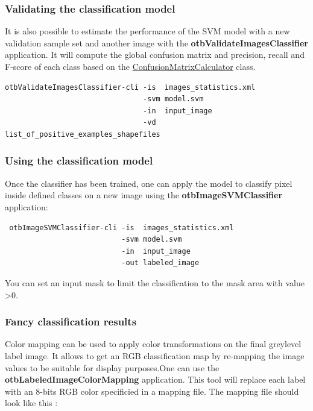 \subsubsection{Validating the classification model}
It is also possible to estimate the performance of the SVM model with a new validation sample set and another image with the \textbf{otbValidateImagesClassifier} application.
It will compute the global confusion matrix and precision, recall and F-score of each class based on the \href{http://www.orfeo-toolbox.org/doxygen-current/classotb_1_1ConfusionMatrixCalculator.html}{ConfusionMatrixCalculator} class.

\begin{verbatim}
otbValidateImagesClassifier-cli -is  images_statistics.xml
                                -svm model.svm
                                -in  input_image
                                -vd  list_of_positive_examples_shapefiles
\end{verbatim}


\subsubsection{Using the classification model} 
Once the classifier has been trained, one can apply the model to classify pixel inside defined classes on a new image using the \textbf{otbImageSVMClassifier} application:

\begin{verbatim}
 otbImageSVMClassifier-cli -is  images_statistics.xml
                           -svm model.svm 
                           -in  input_image
                           -out labeled_image
\end{verbatim}

You can set an input mask to limit the classification to the mask area with value \textgreater 0.

\subsubsection{Fancy classification results}

Color mapping can be used to apply color transformations on the final greylevel label image. It allows to get an RGB classification map by re-mapping the image values to be suitable for display purposes.One can use the \textbf{otbLabeledImageColorMapping} application. This tool will replace each label with an 8-bits RGB color specificied in a mapping file. The mapping file should look like this :

